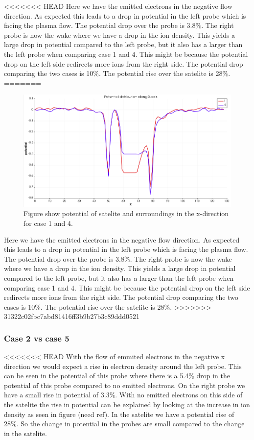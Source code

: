 <<<<<<< HEAD
Here we have the emitted electrons in the negative flow direction. As expected this
leads to a drop in potential in the left probe which is facing the plasma flow. The
potential drop over the probe is 3.8\%. The right probe is now the wake where we have
a drop in the ion density. This yields a large drop in potential compared to the left
probe, but it also has a larger than the left probe when comparing case 1 and 4. This
might be because the potential drop on the left side redirects more ions from the right side.
The potential drop comparing the two cases is 10\%. The potential rise over the satelite is 28\%.
=======
\begin{figure}
    \includegraphics[scale = 0.5 \textwidth]{potential_case1&4.png}
    \caption{Figure show potential of satelite and surroundings in the x-direction for case 1 and 4.}
\end{figure}


Here we have the emitted electrons in the negative flow direction. As expected this leads to a drop in potential in the left probe which is facing the plasma flow. The potential drop over the probe is 3.8\%. The right probe is now the wake where we have a drop in the ion density. This yields a large drop in potential compared to the left probe, but it also has a larger than the left probe when comparing case 1 and 4. This might be because the potential drop on the left side redirects more ions from the right side. The potential drop comparing the two cases is 10\%. The potential rise over the satelite is 28\%.
>>>>>>> 31322c02fbc7abd81416ff3b9b27b3c89ddd0521


\subsubsection{Case 2 vs case 5}

<<<<<<< HEAD
With the flow of emmited electrons in the negative x direction we would expect a rise in electron density around the left probe.
This can be seen in the potential of this probe where there is a 5.4\% drop in the potential of this probe compared to no emitted
electrons. On the right probe we have a small rise in potential of 3.3\%. With no emitted electrons on this side of the satelite the rise in
potential can be explained by looking at the increase in ion density as seen in figure (need ref).
In the satelite we have a potential rise of 28\%. So the change in potential in the probes are small compared to the change in the satelite.

